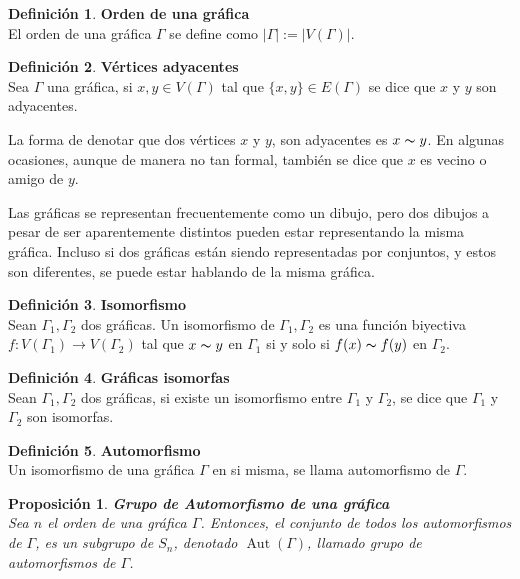 \documentclass[11pt]{book}
\newtheorem{proposition}{Proposición}
\theoremstyle{definition}
\newtheorem{definition}{Definición}
\DeclareMathOperator{\Aut}{Aut}
\begin{document}
\begin{definition}\textbf{Orden de una gráfica}\\
  El orden de una gráfica $\Gamma$ se define como $|\Gamma|:= |V(\Gamma)|$.
\end{definition}

\begin{definition}\textbf{Vértices adyacentes}\\
  Sea $\Gamma$ una gráfica, si $x , y \in V(\Gamma)$ tal que
  $\{x,y\}\in E(\Gamma)$ se dice que $x$ y $y$ son adyacentes.
\end{definition}


La forma de denotar que dos vértices $x$ y $y$, son adyacentes es
$x\thicksim y$. En algunas ocasiones, aunque de manera no tan formal,
también se dice que $x$ es vecino o amigo de $y$.


Las gráficas se representan frecuentemente como un dibujo, pero
dos dibujos a pesar de ser aparentemente distintos pueden estar
representando la misma gráfica. Incluso si dos gráficas están siendo
representadas por conjuntos, y estos son diferentes, se puede estar
hablando de la misma gráfica.

\begin{definition}\textbf{Isomorfismo}\\
  Sean $\Gamma_1,\Gamma_2$ dos gráficas. Un isomorfismo de
  $\Gamma_1,\Gamma_2$ es una función biyectiva $f:
  V(\Gamma_1)\rightarrow V(\Gamma_2)$ tal que $x\thicksim y$ en
  $\Gamma_1$ si y solo si $f(x)\thicksim f(y)$ en $\Gamma_2$.
\end{definition}


\begin{definition}\textbf{Gráficas isomorfas}\\
  Sean $\Gamma_1,\Gamma_2$ dos gráficas, si existe un isomorfismo
  entre $\Gamma_1$ y $\Gamma_2$, se dice que $\Gamma_1$ y $\Gamma_2$
  son isomorfas.
\end{definition}


\begin{definition}\textbf{Automorfismo}\\
  Un isomorfismo de una gráfica $\Gamma$ en si misma, se llama automorfismo de
  $\Gamma$.
\end{definition}



\begin{proposition}\textbf{Grupo de Automorfismo de una gráfica}\\
  Sea $n$ el orden de una gráfica $\Gamma$. Entonces, el conjunto
  de todos los automorfismos de $\Gamma$, es un subgrupo de $S_n$,
  denotado $\Aut(\Gamma)$, llamado grupo de automorfismos de $\Gamma$.
\end{proposition}
\end{document}
